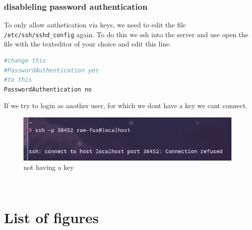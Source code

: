 \documentclass[a4paper]{article}
\begin{document}
\subsubsection {disableling password authentication}
To only allow authetication via keys, we need to edit the file \texttt{/etc/ssh/sshd\_config} again.
To do this we ssh into the server and use open the file with the texteditor of your choice and edit this line.
\begin{lstlisting}[language=bash]
#change this
#PasswordAuthentication yes
#to this
PasswordAuthentication no
\end{lstlisting}
If we try to login as another user, for which we dont have a key we cant connect.
\begin{figure}[h]
	\centering
	\includegraphics[scale=0.35]{images/nokey.png}
	\caption{not having a key}
\end{figure} \\
\newpage

\newpage
\section{List of figures}

\listoffigures
\end{document}
